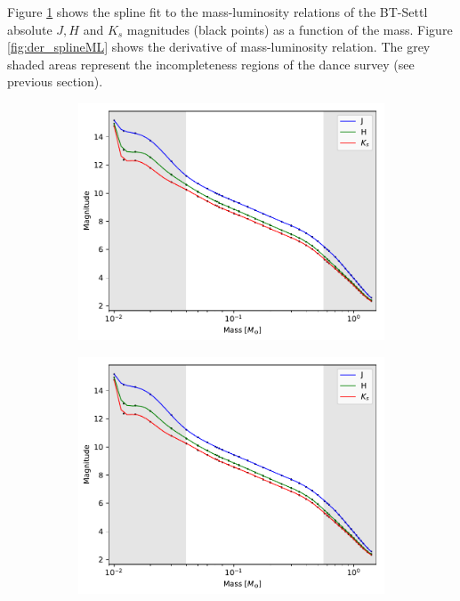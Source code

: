 Figure \ref{fig:splineML} shows the spline fit to the mass-luminosity relations of the BT-Settl absolute $J,H$ and $K_s$ magnitudes (black points) as a function of the mass. Figure \ref{fig:der_splineML} shows the derivative of mass-luminosity relation. The grey shaded areas represent the incompleteness regions of the \gls{dance} survey (see previous section).

\begin{figure}[ht!]
    \centering
    \begin{subfigure}[t]{0.7\textwidth}
    \centering
       \includegraphics[page=1,width=\textwidth]{background/Figures/FitSpline_AllardModels.pdf}
        \caption{}
        \label{fig:splineML}
    \end{subfigure}
    \begin{subfigure}[t]{0.7\textwidth}
    \centering
     \includegraphics[page=2,width=\textwidth]{background/Figures/FitSpline_AllardModels.pdf}

\end{subfigure}
\end{figure}

